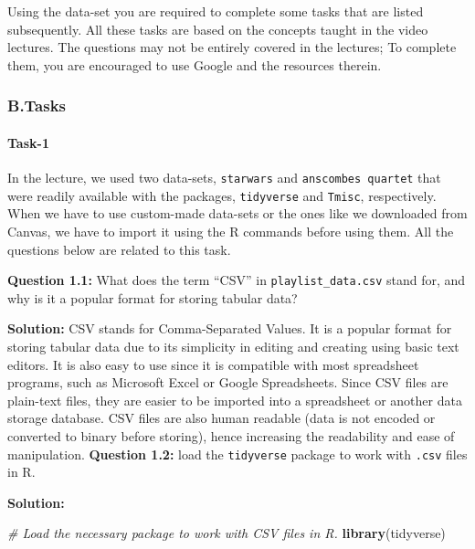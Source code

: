\documentclass[
]{article}
\newenvironment{Shaded}{\begin{snugshade}}{\end{snugshade}}
\newcommand{\CommentTok}[1]{\textcolor[rgb]{0.56,0.35,0.01}{\textit{#1}}}
\newcommand{\FunctionTok}[1]{\textcolor[rgb]{0.13,0.29,0.53}{\textbf{#1}}}
\newcommand{\NormalTok}[1]{#1}
\begin{document}
Using the data-set you are required to complete some tasks that are
listed subsequently. All these tasks are based on the concepts taught in
the video lectures. The questions may not be entirely covered in the
lectures; To complete them, you are encouraged to use Google and the
resources therein.

\hypertarget{b.tasks}{%
\subsubsection{B.Tasks}\label{b.tasks}}

\hypertarget{task-1}{%
\paragraph{Task-1}\label{task-1}}

In the lecture, we used two data-sets, \texttt{starwars} and
\texttt{anscombe\textquotesingle{}s\ quartet} that were readily
available with the packages, \texttt{tidyverse} and \texttt{Tmisc},
respectively. When we have to use custom-made data-sets or the ones like
we downloaded from Canvas, we have to import it using the R commands
before using them. All the questions below are related to this task.

\textbf{Question 1.1:} What does the term ``CSV'' in
\texttt{playlist\_data.csv} stand for, and why is it a popular format
for storing tabular data?

\textbf{Solution:} CSV stands for Comma-Separated Values. It is a
popular format for storing tabular data due to its simplicity in editing
and creating using basic text editors. It is also easy to use since it
is compatible with most spreadsheet programs, such as Microsoft Excel or
Google Spreadsheets. Since CSV files are plain-text files, they are
easier to be imported into a spreadsheet or another data storage
database. CSV files are also human readable (data is not encoded or
converted to binary before storing), hence increasing the readability
and ease of manipulation. \textbf{Question 1.2:} load the
\texttt{tidyverse} package to work with \texttt{.csv} files in R.

\textbf{Solution:}

\begin{Shaded}
\begin{Highlighting}[]
\CommentTok{\# Load the necessary package to work with CSV files in R.}
\FunctionTok{library}\NormalTok{(tidyverse)}
\end{Highlighting}
\end{Shaded}
\end{document}

